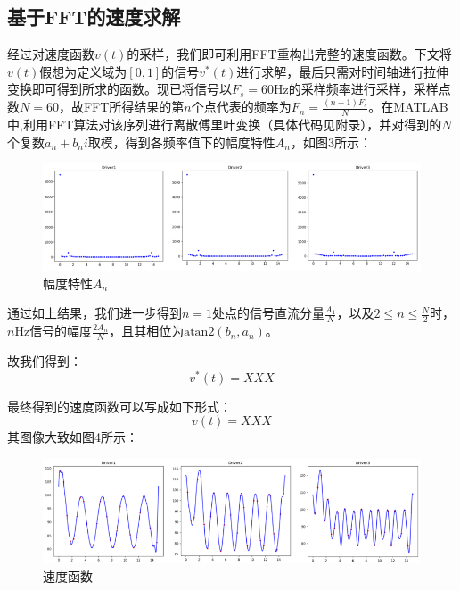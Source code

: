 \documentclass[bwprint]{cumcmthesis}
\begin{document}
        \subsection{基于FFT的速度求解}
        经过对速度函数$v(t)$的采样，我们即可利用FFT重构出完整的速度函数。下文将$v(t)$假想为定义域为$[0,1]$的信号$v^*(t)$进行求解，最后只需对时间轴进行拉伸变换即可得到所求的函数。现已将信号以$F_s=60\mathrm{Hz}$的采样频率进行采样，采样点数$N=60$，故FFT所得结果的第$n$个点代表的频率为$F_n=\frac{(n-1)F_s}{N}$。在MATLAB中,利用FFT算法对该序列进行离散傅里叶变换（具体代码见附录），并对得到的$N$个复数$a_n+b_ni$取模，得到各频率值下的幅度特性$A_n$，如图3所示：
        \begin{figure}[htbp]
            \centering
            \includegraphics[width=1\linewidth]{mod.png}
            \caption{幅度特性$A_n$}
        \end{figure}

        通过如上结果，我们进一步得到$n=1$处点的信号直流分量$\frac{A_1}{N}$，以及$2\leq n\leq \frac{N}{2}$时，$n\mathrm{Hz}$信号的幅度$\frac{2A_n}{N}$，且其相位为$\mathrm{atan2}(b_n,a_n)$。

        故我们得到： 
        \begin{equation*}
            v^*(t)=XXX
        \end{equation*}

        最终得到的速度函数可以写成如下形式：
        \begin{equation*}
            v(t)=XXX
        \end{equation*}
        其图像大致如图4所示：
        \begin{figure}[htbp]
            \centering

            \includegraphics[width=1\linewidth]{v.png}
            \caption{速度函数}
        \end{figure}
\end{document}
